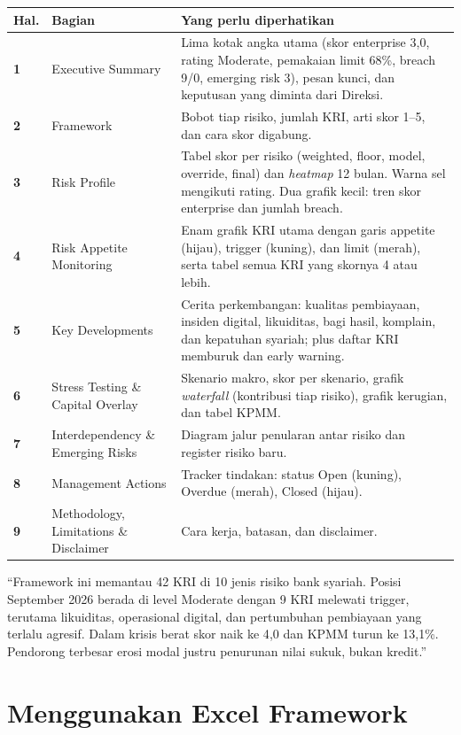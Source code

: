 \documentclass[11pt,a4paper]{article}
\begin{document}
\begin{longtable}{>{\bfseries}p{0.8cm}>{\raggedright\arraybackslash}p{3.8cm}>{\raggedright\arraybackslash}p{10.2cm}}
\toprule
Hal. & Bagian & Yang perlu diperhatikan \\
\midrule
\endhead
1 & Executive Summary & Lima kotak angka utama (skor enterprise 3{,}0, rating Moderate, pemakaian limit 68\%, breach 9/0, emerging risk 3), pesan kunci, dan keputusan yang diminta dari Direksi. \\
2 & Framework & Bobot tiap risiko, jumlah KRI, arti skor 1--5, dan cara skor digabung. \\
3 & Risk Profile & Tabel skor per risiko (weighted, floor, model, override, final) dan \emph{heatmap} 12 bulan. Warna sel mengikuti rating. Dua grafik kecil: tren skor enterprise dan jumlah breach. \\
4 & Risk Appetite Monitoring & Enam grafik KRI utama dengan garis appetite (hijau), trigger (kuning), dan limit (merah), serta tabel semua KRI yang skornya 4 atau lebih. \\
5 & Key Developments & Cerita perkembangan: kualitas pembiayaan, insiden digital, likuiditas, bagi hasil, komplain, dan kepatuhan syariah; plus daftar KRI memburuk dan early warning. \\
6 & Stress Testing \& Capital Overlay & Skenario makro, skor per skenario, grafik \emph{waterfall} (kontribusi tiap risiko), grafik kerugian, dan tabel KPMM. \\
7 & Interdependency \& Emerging Risks & Diagram jalur penularan antar risiko dan register risiko baru. \\
8 & Management Actions & Tracker tindakan: status Open (kuning), Overdue (merah), Closed (hijau). \\
9 & Methodology, Limitations \& Disclaimer & Cara kerja, batasan, dan disclaimer. \\
\bottomrule
\end{longtable}

\begin{tipbox}
``Framework ini memantau 42 KRI di 10 jenis risiko bank syariah. Posisi September 2026 berada di level Moderate dengan 9 KRI melewati trigger, terutama likuiditas, operasional digital, dan pertumbuhan pembiayaan yang terlalu agresif. Dalam krisis berat skor naik ke 4{,}0 dan KPMM turun ke 13{,}1\%. Pendorong terbesar erosi modal justru penurunan nilai sukuk, bukan kredit.''
\end{tipbox}
\section{Menggunakan Excel Framework}\label{sec:excel}
\end{document}
